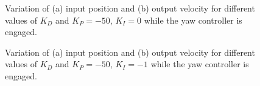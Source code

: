 \begin{figure}[H]
  \centering
  \caption{Variation of (a) input position and (b) output velocity for different values of $K_{D}$ and $K_P=-50$, $K_I=0$ while the yaw controller is engaged.}\label{fig:tune-yaw-der-i0}
\end{figure}

\begin{figure}[H]
  \centering
  \caption{Variation of (a) input position and (b) output velocity for different values of $K_{D}$ and $K_P=-50$, $K_I=-1$ while the yaw controller is engaged.}\label{fig:tune-yaw-der-i1}
\end{figure}

